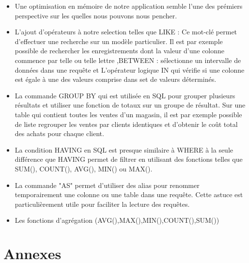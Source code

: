 \documentclass[oneside,13pt,a4paper]{report}
\begin{document}
\begin{itemize}
	\item Une optimisation en mémoire de notre application semble l'une des prémiers perspective sur les quelles nous pouvons nous pencher.
	\item L'ajout d'opérateurs à notre selection telles que LIKE : Ce mot-clé permet d’effectuer une recherche sur un modèle particulier. Il est par exemple possible de rechercher les enregistrements dont la valeur d’une colonne commence par telle ou telle lettre ,BETWEEN : sélectionne un intervalle de données dans une requête et L’opérateur logique IN qui vérifie si une colonne est égale à une des valeurs comprise dans set de valeurs déterminés.
	\item La commande GROUP BY qui est utilisée en SQL pour grouper plusieurs résultats et utiliser une fonction de totaux sur un groupe de résultat. Sur une table qui contient toutes les ventes d’un magasin, il est par exemple possible de liste regrouper les ventes par clients identiques et d’obtenir le coût total des achats pour chaque client.
	\item La condition HAVING en SQL est presque similaire à WHERE à la seule différence que HAVING permet de filtrer en utilisant des fonctions telles que SUM(), COUNT(), AVG(), MIN() ou MAX().
	\item La commande "AS" permet d’utiliser des alias pour renommer temporairement une colonne ou une table dans une requête. Cette astuce est particulièrement utile pour faciliter la lecture des requêtes.
	\item Les fonctions d'agrégation (AVG(),MAX(),MIN(),COUNT(),SUM())
\end{itemize}

\appendix

\chapter{Annexes}
\end{document}
